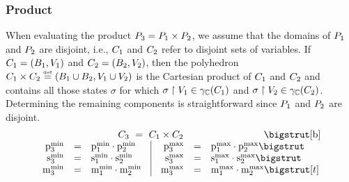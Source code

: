 
\subsubsection{Product}
When evaluating the product $P_{3} = P_{1} \times P_{2}$, we assume
that the domains of $P_{1}$ and $P_{2}$ are disjoint, i.e.,
$C_1$ and $C_2$ refer to disjoint sets of 
variables.  If $ C_1 = (B_1, V_1) $ and $ C_2 = (B_2,
V_2) $, then the polyhedron $C_1 \times C_2 \stackrel{\smash{\scriptscriptstyle \mathrm{def}}}=
\left( B_1 \cup B_2, V_1 \cup V_2 \right)$ is the Cartesian product
of $C_1$ and $C_2$ and contains all those states $\sigma$ for
which $\sigma \upharpoonright V_1 \in \gamma_{\mathbb{C}}(C_1)$ and
$\sigma \upharpoonright V_2 \in \gamma_{\mathbb{C}}(C_2)$. 
Determining the remaining components is straightforward since $P_{1}$
and $P_{2}$ are disjoint. 
\[
\begin{array}{rcl@{\hspace{0.35cm}}|@{\hspace{0.35cm}}rcl}
\multicolumn{6}{c}{\poly_3\ =\ \poly_1 \pprod \poly_2} \bigstrut[b] \\
\pmin{3} &=& \pmin{1} \cdot \pmin{2} &
\pmax{3} &=& \pmax{1} \cdot \pmax{2} \bigstrut \\
\smin{3} &=& \smin{1} \cdot \smin{2} &
\smax{3} &=& \smax{1} \cdot \smax{2} \bigstrut \\
\mmin{3} &=& \mmin{1} \cdot \mmin{2} &
\mmax{3} &=& \mmax{1} \cdot \mmax{2} \bigstrut[t]
\end{array}
\]

